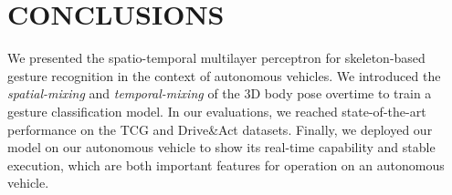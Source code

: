 \documentclass[letterpaper, 10 pt, conference]{ieeeconf}
\begin{document}
\section{CONCLUSIONS}

We presented the spatio-temporal multilayer perceptron for skeleton-based gesture recognition in the context of autonomous vehicles. We introduced the \textit{spatial-mixing} and \textit{temporal-mixing} of the 3D body pose overtime to train a gesture classification model. In our evaluations, we reached state-of-the-art performance on the TCG and Drive\&Act datasets. Finally, we deployed our model on our autonomous vehicle to show its real-time capability and stable execution, which are both important features for operation on an autonomous vehicle.

























\end{document}
